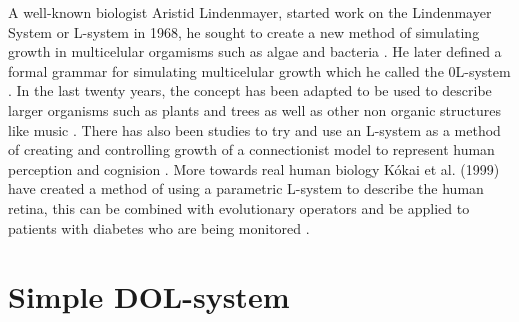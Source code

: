 \begin{flushleft}
A well-known biologist Aristid Lindenmayer, started work on the Lindenmayer System or L-system in 1968, he sought to create a new method of simulating growth in multicelular orgamisms such as algae and bacteria \cite{lindenmayer1968mathematical}. He later defined a formal grammar for simulating multicelular growth which he called the 0L-system \cite {lindenmayer1971developmental}. In the last twenty years, the concept has been adapted to be used to describe larger organisms such as plants and trees as well as other non organic structures like music \cite{worth2005growing}. There has also been studies to try and use an L-system as a method of creating and controlling growth of a connectionist model to represent human perception and cognision \cite{vaario1991connectionist}. More towards real human biology K{\'o}kai et al. (1999) have created a method of using a parametric L-system to describe the human retina, this can be combined with evolutionary operators and be applied to patients with diabetes who are being monitored \cite{kokai1999parametric}.

\end{flushleft}

\section{Simple DOL-system} \label{Simple DOL-systems}

